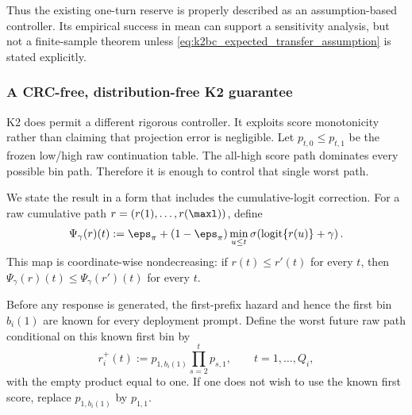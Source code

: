 Thus the existing one-turn reserve is properly described as an
assumption-based controller.  Its empirical success in mean can support a
sensitivity analysis, but not a finite-sample theorem unless
\eqref{eq:k2bc_expected_transfer_assumption} is stated explicitly.

\subsubsection{A CRC-free, distribution-free K2 guarantee}
\label{sec:k2bc_worst_path}

K2 does permit a different rigorous controller.  It exploits score
monotonicity rather than claiming that projection error is negligible.  Let
$p_{t,0}\leq p_{t,1}$ be the frozen low/high raw continuation table.  The
all-high score path dominates every possible bin path.  Therefore it is enough
to control that single worst path.

We state the result in a form that includes the cumulative-logit correction.
For a raw cumulative path $r=(r(1),\ldots,r(\maxl))$, define
\begin{equation}
    \Psi_\gamma(r)(t)
    :=\eps_\pi+(1-\eps_\pi)
      \min_{u\leq t}
      \sigma\!\left(\operatorname{logit}\{r(u)\}+\gamma\right).
    \label{eq:k2bc_isotone_projection}
\end{equation}
This map is coordinate-wise nondecreasing: if $r(t)\leq r'(t)$ for every
$t$, then $\Psi_\gamma(r)(t)\leq\Psi_\gamma(r')(t)$ for every $t$.

Before any response is generated, the first-prefix hazard and hence the first
bin $b_i(1)$ are known for every deployment prompt.  Define the worst future
raw path conditional on this known first bin by
\begin{equation}
    r_i^+(t)
    :=p_{1,b_i(1)}\prod_{s=2}^{t}p_{s,1},
    \qquad t=1,\ldots,Q_i,
    \label{eq:k2bc_worst_raw_path}
\end{equation}
with the empty product equal to one.  If one does not wish to use the known
first score, replace $p_{1,b_i(1)}$ by $p_{1,1}$.

